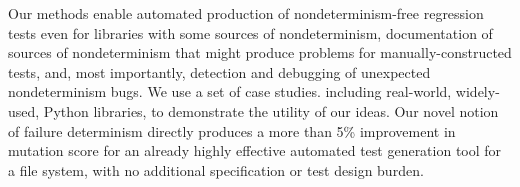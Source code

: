 \begin{comment}
Previous practical approaches to
nondeterminism/flaky test detection and debugging rely either on 1) identifying
potential sources of nondeterminism such as test inter-dependence
\cite{LamZE2015} or certain code smells \cite{palomba2017does}  or 2)
use a heuristic approach to mark failures as likely flaky, such as that taken by DeFlaker
\cite{bell2018d}.  In the real world, people usually detect flaky
tests by the most obvious heuristic of all:  they observe a test both
fail and pass for the same code version.  In a sense, even DeFlaker
relies on this method, but avoids having to observe a flaky test actually
passing, by inferring that if a test was previously passing, and
executes no changed code, its failure after a code change \emph{must}
be due to flakiness/nondeterminism.  Our approach to the problem is
fundamentally different, and essentially orthogonal; we concentrate on the detection and avoidance of
nondeterminism/flakiness using \emph{automated test generation},
and make it possible for a developer or test engineer to detect when
important values generated in automated testing differ without a
change in the test itself or the code under test.  While some of these
changes may be harmless, and unable to propagate to cause test
failures, they are potential sources of flaky behavior.  To our
knowledge, this is the first approach to the problem that
allows detection of (potential sources of) flakiness, based on real divergence in
behavior, without having to observe a test actually fail due to
nondeterminism.  we additionally introduce the first variation of
delta-debugging that properly handles probabilistic faults and
reduction properties.
\end{comment}

Our methods enable automated production of
nondeterminism-free regression tests even for libraries with some
sources of nondeterminism, documentation of sources of
nondeterminism that might produce problems for manually-constructed
tests, and, most importantly, detection and debugging of 
unexpected nondeterminism bugs.  We use a set
of case studies. including real-world, widely-used, Python libraries, to demonstrate the
utility of our ideas.  Our novel notion of failure determinism directly
produces a more than 5\% improvement in mutation score for an already highly
effective automated test generation tool for a file system, with no
additional specification or test design burden.